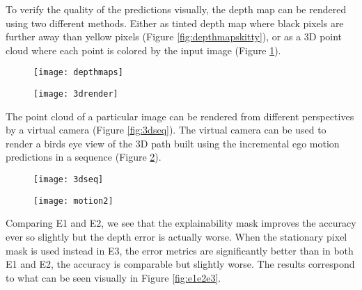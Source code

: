 \begin{table}[H]
\label{table:experiments}
\end{table}

To verify the quality of the predictions visually, the depth map can be rendered using two different methods. Either as tinted depth map where black pixels are further away than yellow pixels (Figure \ref{fig:depthmapskitty}), or as a 3D point cloud where each point is colored by the input image (Figure \ref{fig:3drender}).

\begin{figure}[H]
	\centering
	\begin{minipage}{.5\textwidth}
		\centering
		\texttt{[image: depthmaps]}
		\label{fig:depthmapskitty}
	\end{minipage}%
	\begin{minipage}{.5\textwidth}
		\centering
		\texttt{[image: 3drender]}
		\label{fig:3drender}
	\end{minipage}
\end{figure}

The point cloud of a particular image can be rendered from different perspectives by a virtual camera (Figure \ref{fig:3dseq}). The virtual camera can be used to render a birds eye view of the 3D path built using the incremental ego motion predictions in a sequence (Figure \ref{fig:movement}).

\begin{figure}[H]
	\centering
	\begin{minipage}{.5\textwidth}
		\centering
		\texttt{[image: 3dseq]}
		\label{fig:3dseq}
	\end{minipage}%
	\begin{minipage}{.5\textwidth}
		\centering
		\texttt{[image: motion2]}
		\label{fig:movement}
	\end{minipage}
\end{figure}

Comparing E1 and E2, we see that the explainability mask improves the accuracy ever so slightly but the depth error is actually worse. When the stationary pixel mask is used instead in E3, the error metrics are significantly better than in both E1 and E2, the accuracy is comparable but slightly worse. The results correspond to what can be seen visually in Figure \ref{fig:e1e2e3}.

